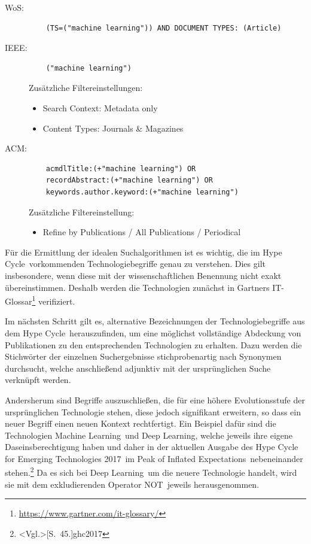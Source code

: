 \begin{description}
	\item [WoS:] \begin{verbatim}
	(TS=("machine learning")) AND DOCUMENT TYPES: (Article)
	\end{verbatim}

	\item [IEEE:] \begin{verbatim}
	("machine learning")
	\end{verbatim}
	Zusätzliche Filtereinstellungen:
	\begin{itemize}
		\item Search Context: Metadata only
		\item Content Types: Journals \& Magazines
	\end{itemize}

	\item [ACM:] \begin{verbatim}
	acmdlTitle:(+"machine learning") OR
	recordAbstract:(+"machine learning") OR
	keywords.author.keyword:(+"machine learning")
	\end{verbatim}
	Zusätzliche Filtereinstellung:
	\begin{itemize}
		\item Refine by Publications / All Publications / Periodical
	\end{itemize}
\end{description}

Für die Ermittlung der idealen Suchalgorithmen ist es wichtig, die im \glqq Hype Cycle\grqq~vorkommenden Technologiebegriffe genau zu verstehen. Dies gilt insbesondere, wenn diese mit der wissenschaftlichen Benennung nicht exakt übereinstimmen. Deshalb werden die Technologien zunächst in Gartners IT-Glossar\footnote{\url{https://www.gartner.com/it-glossary/}} verifiziert.

Im nächsten Schritt gilt es, alternative Bezeichnungen der Technologiebegriffe aus dem \glqq Hype Cycle\grqq~herauszufinden, um eine möglichst vollständige Abdeckung von Publikationen zu den entsprechenden Technologien zu erhalten. Dazu werden die Stichwörter der einzelnen Suchergebnisse stichprobenartig nach Synonymen durchsucht, welche anschließend adjunktiv mit der ursprünglichen Suche verknüpft werden.

Andersherum sind Begriffe auszuschließen, die für eine höhere Evolutionsstufe der ursprünglichen Technologie stehen, diese jedoch signifikant erweitern, so dass ein neuer Begriff einen neuen Kontext rechtfertigt. Ein Beispiel dafür sind die Technologien \glqq Machine Learning\grqq~und \glqq Deep Learning\grqq, welche jeweils ihre eigene Daseinsberechtigung haben und daher in der aktuellen Ausgabe des \glqq Hype Cycle for Emerging Technologies 2017\grqq~im \glqq Peak of Inflated Expectations\grqq~nebeneinander stehen.\footnote{\citeNP<Vgl.>[S.~45.]{ghc2017}} Da es sich bei \glqq Deep Learning\grqq~um die neuere Technologie handelt, wird sie mit dem exkludierenden Operator \glqq NOT\grqq~jeweils herausgenommen.

